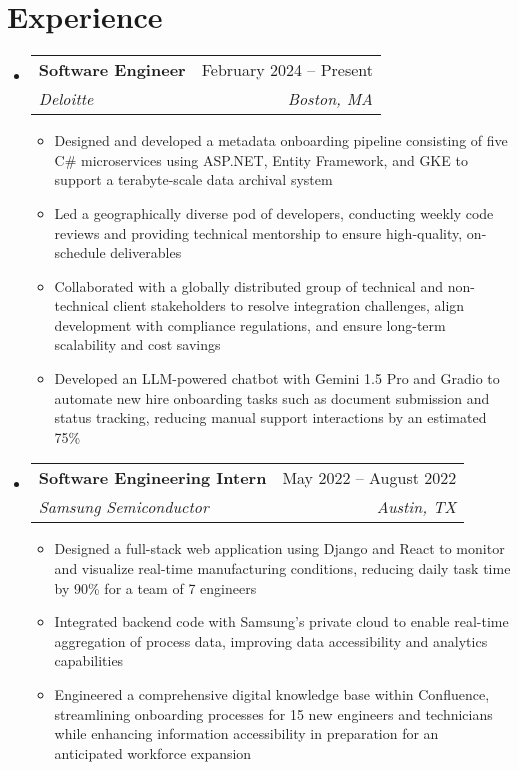 \documentclass[letterpaper,11pt]{article}
\makeatletter
\newcommand{\resumeItem}[1]{
  \item\small{
    {#1 \vspace{-2pt}}
  }
}
\newcommand{\resumeSubheading}[4]{
  \vspace{-2pt}\item
    \begin{tabular*}{0.97\textwidth}[t]{l@{\extracolsep{\fill}}r}
      \textbf{#1} & #2 \\
      \textit{\small#3} & \textit{\small #4} \\
    \end{tabular*}\vspace{-7pt}
}
\newcommand{\resumeSubHeadingListStart}{\begin{itemize}[leftmargin=0.15in, label={}]}
\newcommand{\resumeSubHeadingListEnd}{\end{itemize}}
\newcommand{\resumeItemListStart}{\begin{itemize}}
\newcommand{\resumeItemListEnd}{\end{itemize}\vspace{-5pt}}
\makeatother
\begin{document}
\section{Experience}
  \resumeSubHeadingListStart    
    \resumeSubheading
      {Software Engineer}{February 2024 -- Present}
      {Deloitte}{Boston, MA}
      \resumeItemListStart
        \resumeItem{Designed and developed a metadata onboarding pipeline consisting of five C\# microservices using  ASP.NET, Entity Framework, and GKE to support a terabyte-scale data archival system}
        \resumeItem{Led a geographically diverse pod of developers, conducting weekly code reviews and providing technical mentorship to ensure high-quality, on-schedule deliverables}
        \resumeItem{Collaborated with a globally distributed group of technical and non-technical client stakeholders to resolve integration challenges, align development with compliance regulations, and ensure long-term scalability and cost savings}
        \resumeItem{Developed an LLM-powered chatbot with Gemini 1.5 Pro and Gradio to automate new hire onboarding tasks such as document submission and status tracking, reducing manual support interactions by an estimated 75\%}
      \resumeItemListEnd
    \resumeSubheading
      {Software Engineering Intern}{May 2022 -- August 2022}
      {Samsung Semiconductor}{Austin, TX}
      \resumeItemListStart
        \resumeItem{Designed a full-stack web application using Django and React to monitor and visualize real-time manufacturing conditions, reducing daily task time by 90\% for a team of 7 engineers}
        \resumeItem{Integrated backend code with Samsung's private cloud to enable real-time aggregation of process data, improving data accessibility and analytics capabilities}
        \resumeItem{Engineered a comprehensive digital knowledge base within Confluence, streamlining onboarding processes for 15 new engineers and technicians while enhancing information accessibility in preparation for an anticipated workforce expansion}
      \resumeItemListEnd
  \resumeSubHeadingListEnd

\end{document}
